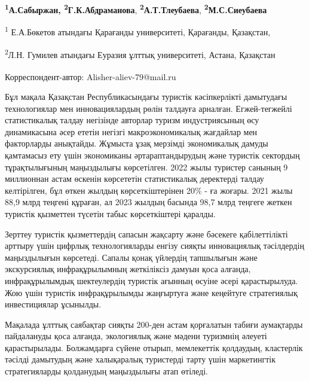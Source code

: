 
\begin{articleheader}

{\bfseries \textsuperscript{1}А.Сабыржан\textsuperscript{\envelope },
\textsuperscript{2}Г.К.Абдраманова},
{\bfseries \textsuperscript{2}А.Т.Тлеубаева},
{\bfseries \textsuperscript{2}М.С.Сиеубаева}
\end{articleheader}
\begin{affiliation}

\textsuperscript{1} Е.А.Бөкетов атындағы Қарағанды университеті,
Қарағанды, Қазақстан,

\textsuperscript{2}Л.Н. Гумилев атындағы Еуразия ұлттық университеті,
Астана, Қазақстан

\raggedright{\bfseries \textsuperscript{\envelope }}Корреспондент-автор:
Alisher-aliev-79@mail.ru
\end{affiliation}

Бұл мақала Қазақстан Республикасындағы туристік кәсіпкерлікті дамытудағы
технологиялар мен инновациялардың рөлін талдауға арналған.
Егжей-тегжейлі статистикалық талдау негізінде авторлар туризм
индустриясының өсу динамикасына әсер ететін негізгі макроэкономикалық
жағдайлар мен факторларды анықтайды. Жұмыста ұзақ мерзімді экономикалық
дамуды қамтамасыз ету үшін экономиканы әртараптандырудың және туристік
сектордың тұрақтылығының маңыздылығы көрсетілген. 2022 жылы туристер
санының 9 миллионнан астам өскенін көрсететін статистикалық деректерді
талдау келтірілген, бұл өткен жылдың көрсеткіштерінен 20\% - ға жоғары.
2021 жылы 88,9 млрд теңгені құраған, ал 2023 жылдың басында 98,7 млрд
теңгеге жеткен туристік қызметтен түсетін табыс көрсеткіштері қаралды.

Зерттеу туристік қызметтердің сапасын жақсарту және бәсекеге
қабілеттілікті арттыру үшін цифрлық технологияларды енгізу сияқты
инновациялық тәсілдердің маңыздылығын көрсетеді. Сапалы қонақ үйлердің
тапшылығын және экскурсиялық инфрақұрылымның жеткіліксіз дамуын қоса
алғанда, инфрақұрылымдық шектеулердің туристік ағынның өсуіне әсері
қарастырылуда. Жою үшін туристік инфрақұрылымды жаңғыртуға және
кеңейтуге стратегиялық инвестициялар ұсынылды.

Мақалада ұлттық саябақтар сияқты 200-ден астам қорғалатын табиғи
аумақтарды пайдалануды қоса алғанда, экологиялық және мәдени туризмнің
әлеуеті қарастырылады. Болжамдарға сүйене отырып, мемлекеттік қолдаудың,
кластерлік тәсілді дамытудың және халықаралық туристерді тарту үшін
маркетингтік стратегияларды қолданудың маңыздылығы атап өтіледі.

